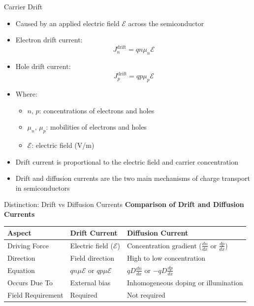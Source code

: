 \begin{frame}{Carrier Drift}
    \begin{itemize}
        \item Caused by an applied electric field $\mathcal{E}$ across the semiconductor
        \item Electron drift current:
        \begin{equation}
        J_n^{\text{drift}} = q n \mu_n \mathcal{E}
        \end{equation}
        \item Hole drift current:
        \begin{equation}
        J_p^{\text{drift}} = q p \mu_p \mathcal{E}
        \end{equation}
        \item Where:
        \begin{itemize}
            \item $n$, $p$: concentrations of electrons and holes
            \item $\mu_n$, $\mu_p$: mobilities of electrons and holes
            \item $\mathcal{E}$: electric field (V/m)
        \end{itemize}
        \item Drift current is proportional to the electric field and carrier concentration
        \item Drift and diffusion currents are the two main mechanisms of charge transport in semiconductors
    \end{itemize}
\end{frame}



\begin{frame}{Distinction: Drift vs Diffusion Currents}
    \centering
    \textbf{Comparison of Drift and Diffusion Currents} \\[1ex]
    \begin{tabular}{|p{3cm}|p{4cm}|p{4cm}|}
        \hline
        \textbf{Aspect} & \textbf{Drift Current} & \textbf{Diffusion Current} \\
        \hline
        Driving Force & Electric field ($\mathcal{E}$) & Concentration gradient ($\frac{dn}{dx}$ or $\frac{dp}{dx}$) \\
        \hline
        Direction & Field direction & High to low concentration \\
        \hline
        Equation & $q n \mu \mathcal{E}$ or $q p \mu \mathcal{E}$ & $q D \frac{dn}{dx}$ or $-q D \frac{dp}{dx}$ \\
        \hline
        Occurs Due To & External bias & Inhomogeneous doping or illumination \\
        \hline
        Field Requirement & Required & Not required \\
        \hline
    \end{tabular}
\end{frame}

